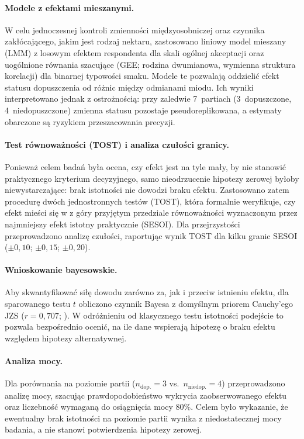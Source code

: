 \paragraph{Modele z efektami mieszanymi.}
W celu jednoczesnej kontroli zmienności międzyosobniczej oraz czynnika
zakłócającego, jakim jest rodzaj nektaru, zastosowano liniowy model
mieszany (LMM) z losowym efektem respondenta dla skali ogólnej
akceptacji oraz uogólnione równania szacujące (GEE; rodzina dwumianowa,
wymienna struktura korelacji) dla binarnej typowości smaku. Modele
te pozwalają oddzielić efekt statusu dopuszczenia od różnic między
odmianami miodu. Ich wyniki interpretowano jednak z ostrożnością:
przy zaledwie 7~partiach (3~dopuszczone, 4~niedopuszczone)
zmienna statusu pozostaje pseudoreplikowana, a estymaty obarczone są
ryzykiem przeszacowania precyzji.

\paragraph{Test równoważności (TOST) i analiza czułości granicy.}
Ponieważ celem badań była ocena, czy efekt jest na tyle mały, by nie
stanowić praktycznego kryterium decyzyjnego, samo nieodrzucenie hipotezy
zerowej byłoby niewystarczające:  brak istotności nie dowodzi braku
efektu. Zastosowano zatem procedurę dwóch jednostronnych testów (TOST),
która formalnie weryfikuje, czy efekt mieści się w z góry przyjętym
przedziale równoważności wyznaczonym przez najmniejszy efekt istotny
praktycznie (SESOI). Dla przejrzystości przeprowadzono analizę czułości,
raportując wynik TOST dla kilku granic SESOI ($\pm 0{,}10$;
$\pm 0{,}15$; $\pm 0{,}20$).

\paragraph{Wnioskowanie bayesowskie.}
Aby skwantyfikować siłę dowodu zarówno za, jak i przeciw istnieniu
efektu, dla sparowanego testu $t$ obliczono czynnik Bayesa z domyślnym
priorem Cauchy'ego JZS ($r = 0{,}707$; \cite{Rouder2009}). W odróżnieniu
od klasycznego testu istotności podejście to pozwala bezpośrednio ocenić,
na ile dane wspierają hipotezę o braku efektu względem hipotezy
alternatywnej.

\paragraph{Analiza mocy.}
Dla porównania na poziomie partii ($n_{\mathrm{dop.}} = 3$ vs.\ $n_{\mathrm{niedop.}} = 4$) przeprowadzono
analizę mocy, szacując prawdopodobieństwo wykrycia zaobserwowanego efektu
oraz liczebność wymaganą do osiągnięcia mocy 80\%. Celem było wykazanie,
że ewentualny brak istotności na poziomie partii wynika z niedostatecznej
mocy badania, a nie stanowi potwierdzenia hipotezy zerowej.

